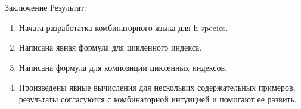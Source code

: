 \documentclass{beamer}
\begin{document}
\begin{frame}{Заключение}
Результат:
\begin{enumerate}[*]
\item Начата разработатка комбинаторного языка для h-species.
\item Написана явная формула для цикленного индекса.
\item Написана формула для композиции цикленных индексов.
\item Произведены явные вычисления для нескольких содержательных примеров,
результаты согласуются с комбинаторной интуицией и помогают ее развить.
\end{enumerate}
\end{frame}
\end{document}

